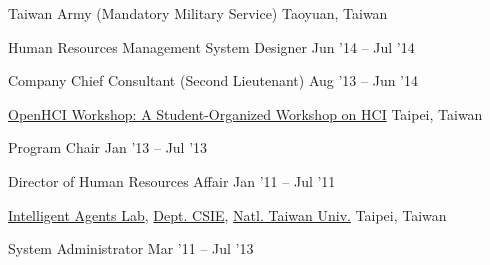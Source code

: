 \documentclass[10pt, a4paper]{article} %
\begin{document}

\headedsection
{Taiwan Army (Mandatory Military Service)}
{Taoyuan, Taiwan}{

	\headedsubsection
	{Human Resources Management System Designer}
	{Jun '14 -- Jul '14}
	{}

	\headedsubsection
	{Company Chief Consultant (Second Lieutenant)}
	{Aug '13 -- Jun '14}
	{}

}


\headedsection
{\href{http://www.openhci.com/}{OpenHCI Workshop: A Student-Organized Workshop on HCI}}
{Taipei, Taiwan}{

	\headedsubsection
	{Program Chair}
	{Jan '13 -- Jul '13}
	{}

	\headedsubsection
	{Director of Human Resources Affair}
	{Jan '11 -- Jul '11}
	{}

}


\headedsection
{\href{http://agent.csie.ntu.edu.tw/}{Intelligent Agents Lab}, 
 \href{http://www.csie.ntu.edu.tw}{Dept. CSIE},
 \href{http://www.ntu.edu.tw}{Natl. Taiwan Univ.}}
{Taipei, Taiwan}{

	\headedsubsection
	{System Administrator}
	{Mar '11 -- Jul '13}
	{}

}


\spacedhrule{1.5em}{-1em} %
\end{document}
